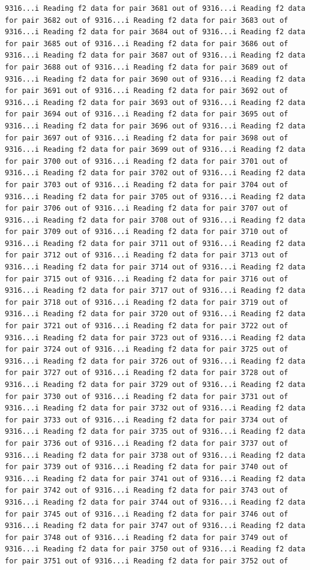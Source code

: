 \documentclass[
]{article}
\begin{document}
\begin{verbatim}
9316...i Reading f2 data for pair 3681 out of 9316...i Reading f2 data for pair 3682 out of 9316...i Reading f2 data for pair 3683 out of 9316...i Reading f2 data for pair 3684 out of 9316...i Reading f2 data for pair 3685 out of 9316...i Reading f2 data for pair 3686 out of 9316...i Reading f2 data for pair 3687 out of 9316...i Reading f2 data for pair 3688 out of 9316...i Reading f2 data for pair 3689 out of 9316...i Reading f2 data for pair 3690 out of 9316...i Reading f2 data for pair 3691 out of 9316...i Reading f2 data for pair 3692 out of 9316...i Reading f2 data for pair 3693 out of 9316...i Reading f2 data for pair 3694 out of 9316...i Reading f2 data for pair 3695 out of 9316...i Reading f2 data for pair 3696 out of 9316...i Reading f2 data for pair 3697 out of 9316...i Reading f2 data for pair 3698 out of 9316...i Reading f2 data for pair 3699 out of 9316...i Reading f2 data for pair 3700 out of 9316...i Reading f2 data for pair 3701 out of 9316...i Reading f2 data for pair 3702 out of 9316...i Reading f2 data for pair 3703 out of 9316...i Reading f2 data for pair 3704 out of 9316...i Reading f2 data for pair 3705 out of 9316...i Reading f2 data for pair 3706 out of 9316...i Reading f2 data for pair 3707 out of 9316...i Reading f2 data for pair 3708 out of 9316...i Reading f2 data for pair 3709 out of 9316...i Reading f2 data for pair 3710 out of 9316...i Reading f2 data for pair 3711 out of 9316...i Reading f2 data for pair 3712 out of 9316...i Reading f2 data for pair 3713 out of 9316...i Reading f2 data for pair 3714 out of 9316...i Reading f2 data for pair 3715 out of 9316...i Reading f2 data for pair 3716 out of 9316...i Reading f2 data for pair 3717 out of 9316...i Reading f2 data for pair 3718 out of 9316...i Reading f2 data for pair 3719 out of 9316...i Reading f2 data for pair 3720 out of 9316...i Reading f2 data for pair 3721 out of 9316...i Reading f2 data for pair 3722 out of 9316...i Reading f2 data for pair 3723 out of 9316...i Reading f2 data for pair 3724 out of 9316...i Reading f2 data for pair 3725 out of 9316...i Reading f2 data for pair 3726 out of 9316...i Reading f2 data for pair 3727 out of 9316...i Reading f2 data for pair 3728 out of 9316...i Reading f2 data for pair 3729 out of 9316...i Reading f2 data for pair 3730 out of 9316...i Reading f2 data for pair 3731 out of 9316...i Reading f2 data for pair 3732 out of 9316...i Reading f2 data for pair 3733 out of 9316...i Reading f2 data for pair 3734 out of 9316...i Reading f2 data for pair 3735 out of 9316...i Reading f2 data for pair 3736 out of 9316...i Reading f2 data for pair 3737 out of 9316...i Reading f2 data for pair 3738 out of 9316...i Reading f2 data for pair 3739 out of 9316...i Reading f2 data for pair 3740 out of 9316...i Reading f2 data for pair 3741 out of 9316...i Reading f2 data for pair 3742 out of 9316...i Reading f2 data for pair 3743 out of 9316...i Reading f2 data for pair 3744 out of 9316...i Reading f2 data for pair 3745 out of 9316...i Reading f2 data for pair 3746 out of 9316...i Reading f2 data for pair 3747 out of 9316...i Reading f2 data for pair 3748 out of 9316...i Reading f2 data for pair 3749 out of 9316...i Reading f2 data for pair 3750 out of 9316...i Reading f2 data for pair 3751 out of 9316...i Reading f2 data for pair 3752 out of 
\end{verbatim}
\end{document}

